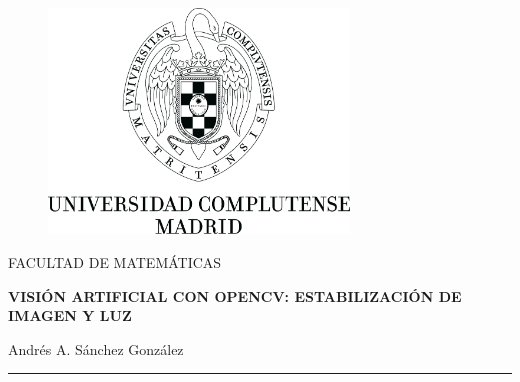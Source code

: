 \documentclass[a4paper,openright, 12pt]{book}
\begin{document}
\def\thepage{\roman{page}}
\begin{titlepage}


\begin{center}
\vspace*{-1in}
\begin{figure}[htb]
\begin{center}
\includegraphics[width=8cm]{logo}
\end{center}
\end{figure}

FACULTAD DE MATEMÁTICAS\\
\vspace*{0.7in}

\begin{Large}
\textbf{VISIÓN ARTIFICIAL CON OPENCV: ESTABILIZACIÓN DE IMAGEN Y LUZ} \\
\end{Large}
\vspace*{0.5in}
\begin{large}
Andrés A. Sánchez González\\
\end{large}
\vspace*{0.3in}
\rule{80mm}{0.1mm}\\
\vspace*{0.1in}

\end{center}

\end{titlepage}

\newpage

\thispagestyle{empty} 

\begingroup
\let\cleardoublepage\clearpage
\tableofcontents
\endgroup
\newpage
\mbox{}
\let\cleardoublepage\clearpage
\def\thepage{\roman{page}}
\end{document}
